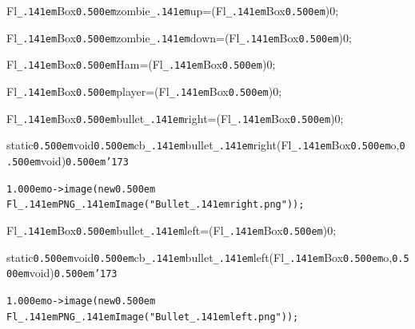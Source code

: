 \documentclass[12pt]{article}
\begin{document}
\noindent
{}\hfill

\noindent
{}Fl{\tt\_\kern.141em}Box{\tt\mc \kern0.500em}{\tt *}zombie{\tt\_\kern.141em}up=(Fl{\tt\_\kern.141em}Box{\tt\mc \kern0.500em}{\tt *})0;

\noindent
{}\hfill

\noindent
{}Fl{\tt\_\kern.141em}Box{\tt\mc \kern0.500em}{\tt *}zombie{\tt\_\kern.141em}down=(Fl{\tt\_\kern.141em}Box{\tt\mc \kern0.500em}{\tt *})0;

\noindent
{}\hfill

\noindent
{}Fl{\tt\_\kern.141em}Box{\tt\mc \kern0.500em}{\tt *}Ham=(Fl{\tt\_\kern.141em}Box{\tt\mc \kern0.500em}{\tt *})0;

\noindent
{}\hfill

\noindent
{}Fl{\tt\_\kern.141em}Box{\tt\mc \kern0.500em}{\tt *}player=(Fl{\tt\_\kern.141em}Box{\tt\mc \kern0.500em}{\tt *})0;

\noindent
{}\hfill

\noindent
{}Fl{\tt\_\kern.141em}Box{\tt\mc \kern0.500em}{\tt *}bullet{\tt\_\kern.141em}right=(Fl{\tt\_\kern.141em}Box{\tt\mc \kern0.500em}{\tt *})0;

\noindent
{}\hfill

\noindent
{}static{\tt\mc \kern0.500em}void{\tt\mc \kern0.500em}cb{\tt\_\kern.141em}bullet{\tt\_\kern.141em}right(Fl{\tt\_\kern.141em}Box{\tt *}{\tt\mc \kern0.500em}o,{\tt\mc \kern0.500em}void{\tt *}){\tt\mc \kern0.500em}{\tt\char'173}

\noindent
{}{\tt\mc \kern1.000em}\tt\mc {\tt /}{\tt /}o{\tt -}{\tt >}image(new\kern0.500em Fl{\tt\_\kern.141em}PNG{\tt\_\kern.141em}Image({\tt "}Bullet{\tt\_\kern.141em}right.png{\tt "}));

\noindent
\tt{}

\noindent
{}\hfill

\noindent
{}Fl{\tt\_\kern.141em}Box{\tt\mc \kern0.500em}{\tt *}bullet{\tt\_\kern.141em}left=(Fl{\tt\_\kern.141em}Box{\tt\mc \kern0.500em}{\tt *})0;

\noindent
{}\hfill

\noindent
{}static{\tt\mc \kern0.500em}void{\tt\mc \kern0.500em}cb{\tt\_\kern.141em}bullet{\tt\_\kern.141em}left(Fl{\tt\_\kern.141em}Box{\tt *}{\tt\mc \kern0.500em}o,{\tt\mc \kern0.500em}void{\tt *}){\tt\mc \kern0.500em}{\tt\char'173}

\noindent
{}{\tt\mc \kern1.000em}\tt\mc {\tt /}{\tt /}o{\tt -}{\tt >}image(new\kern0.500em Fl{\tt\_\kern.141em}PNG{\tt\_\kern.141em}Image({\tt "}Bullet{\tt\_\kern.141em}left.png{\tt "}));
\end{document}
